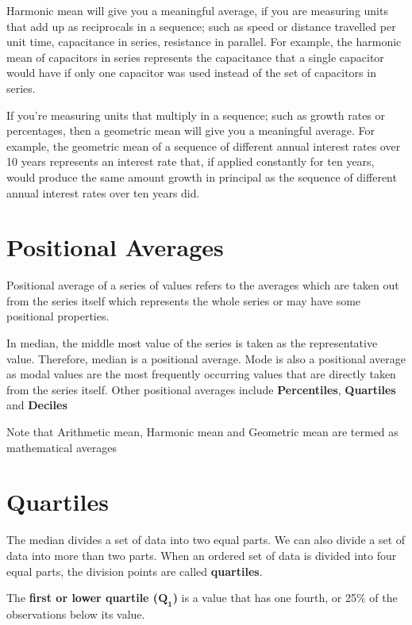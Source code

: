 \documentclass[
]{book}
\begin{document}
Harmonic mean will give you a meaningful average, if you are measuring
units that add up as reciprocals in a sequence; such as speed or
distance travelled per unit time, capacitance in series, resistance in
parallel. For example, the harmonic mean of capacitors in series
represents the capacitance that a single capacitor would have if only
one capacitor was used instead of the set of capacitors in series.

If you're measuring units that multiply in a sequence; such as growth
rates or percentages, then a geometric mean will give you a meaningful
average. For example, the geometric mean of a sequence of different
annual interest rates over 10 years represents an interest rate that, if
applied constantly for ten years, would produce the same amount growth
in principal as the sequence of different annual interest rates over ten
years did.

\hypertarget{positional-averages}{%
\section{Positional Averages}\label{positional-averages}}

Positional average of a series of values refers to the averages which
are taken out from the series itself which represents the whole series
or may have some positional properties.

In median, the middle most value of the series is taken as the
representative value. Therefore, median is a positional average. Mode is
also a positional average as modal values are the most frequently
occurring values that are directly taken from the series itself. Other
positional averages include \textbf{Percentiles}, \textbf{Quartiles} and
\textbf{Deciles}

Note that Arithmetic mean, Harmonic mean and Geometric mean are termed
as mathematical averages

\hypertarget{quartile}{%
\section{Quartiles}\label{quartile}}

The median divides a set of data into two equal parts. We can also
divide a set of data into more than two parts. When an ordered set of
data is divided into four equal parts, the division points are called
\textbf{quartiles}.

The \textbf{first or lower quartile (}\(\mathbf{Q}_{\mathbf{1}}\)\textbf{)} is a
value that has one fourth, or 25\% of the observations below its value.
\end{document}
